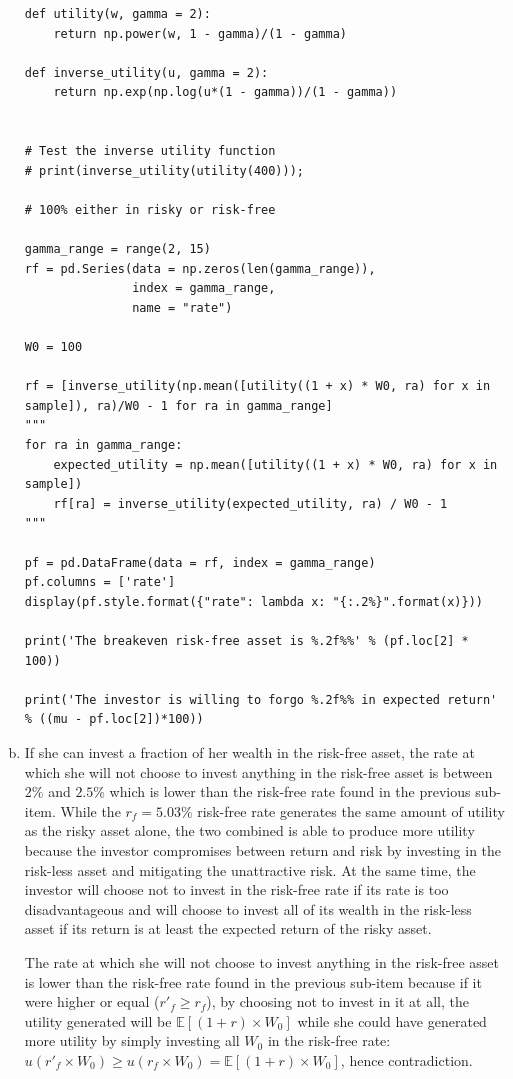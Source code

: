\documentclass[10pt]{article}
\newcommand{\Ebb}{\mathbb{E}}
\newenvironment{exercise}[2][Exercise]{\begin{trivlist}
  \item[\hskip \labelsep {\bfseries #1}\hskip \labelsep {\bfseries #2.}]}{\end{trivlist}}
\begin{document}
\begin{exercise}{2}
\begin{enumerate}[(a)]
\begin{lstlisting}
def utility(w, gamma = 2):
    return np.power(w, 1 - gamma)/(1 - gamma)

def inverse_utility(u, gamma = 2):
    return np.exp(np.log(u*(1 - gamma))/(1 - gamma))


# Test the inverse utility function
# print(inverse_utility(utility(400)));

# 100% either in risky or risk-free

gamma_range = range(2, 15)
rf = pd.Series(data = np.zeros(len(gamma_range)),
               index = gamma_range,
               name = "rate")

W0 = 100

rf = [inverse_utility(np.mean([utility((1 + x) * W0, ra) for x in sample]), ra)/W0 - 1 for ra in gamma_range]
"""
for ra in gamma_range:
    expected_utility = np.mean([utility((1 + x) * W0, ra) for x in sample])
    rf[ra] = inverse_utility(expected_utility, ra) / W0 - 1
"""
    
pf = pd.DataFrame(data = rf, index = gamma_range)
pf.columns = ['rate']
display(pf.style.format({"rate": lambda x: "{:.2%}".format(x)}))

print('The breakeven risk-free asset is %.2f%%' % (pf.loc[2] * 100))

print('The investor is willing to forgo %.2f%% in expected return' % ((mu - pf.loc[2])*100))
    \end{lstlisting}
    \item
      If she can invest a fraction of her wealth in the risk-free asset, the
      rate at which she will not choose to invest anything in the risk-free
      asset is between $2\%$ and $2.5\%$ which is lower than the risk-free rate
      found in the previous sub-item.
      While the $r_f = 5.03\%$ risk-free rate generates the same amount of
      utility as the risky asset alone, the two combined is able to produce more
      utility because the investor compromises between return and risk by
      investing in the risk-less asset and mitigating the unattractive risk.
      At the same time, the investor will choose not to invest in the risk-free
      rate if its rate is too disadvantageous and will choose to invest all of
      its wealth in the risk-less asset if its return is at least the expected
      return of the risky asset.

      The rate at which she will not choose to
      invest anything in the risk-free asset is lower than the risk-free rate
      found in the previous sub-item because if it were higher or equal ($r'_f \geq 
      r_f$), by
      choosing not to invest in it at all, the utility generated will be
      $\Ebb\left[ (1 + r) \times W_0 \right]$ while she could have generated more
      utility by simply investing all $W_0$ in the risk-free rate:
      $u(r'_f \times W_0) \geq u(r_f \times W_0) = \Ebb\left[ (1 + r) \times W_0
      \right]$, hence contradiction.
      

\end{enumerate}
\end{exercise}
\end{document}
